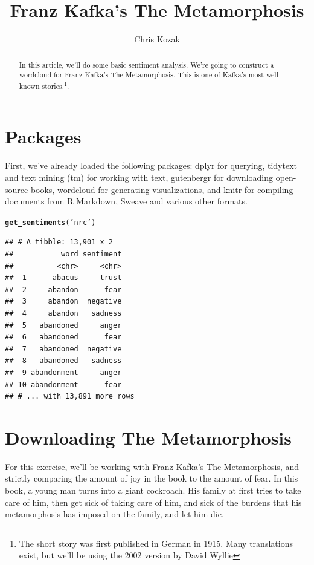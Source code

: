 \documentclass{article}\usepackage[]{graphicx}\usepackage[]{color}
\makeatletter
\newcommand{\hlstr}[1]{\textcolor[rgb]{0.192,0.494,0.8}{#1}}%
\newcommand{\hlstd}[1]{\textcolor[rgb]{0.345,0.345,0.345}{#1}}%
\newcommand{\hlkwd}[1]{\textcolor[rgb]{0.737,0.353,0.396}{\textbf{#1}}}%
\newenvironment{kframe}{%
 \def\at@end@of@kframe{}%
 \ifinner\ifhmode%
  \def\at@end@of@kframe{\end{minipage}}%
  \begin{minipage}{\columnwidth}%
 \fi\fi%
 \def\FrameCommand##1{\hskip\@totalleftmargin \hskip-\fboxsep
 \colorbox{shadecolor}{##1}\hskip-\fboxsep
     \hskip-\linewidth \hskip-\@totalleftmargin \hskip\columnwidth}%
 \MakeFramed {\advance\hsize-\width
   \@totalleftmargin\z@ \linewidth\hsize
   \@setminipage}}%
 {\par\unskip\endMakeFramed%
 \at@end@of@kframe}
\newenvironment{knitrout}{}{} %
\makeatother
\begin{document}
\title{Franz Kafka's The Metamorphosis}
\author{Chris Kozak}
\maketitle

\begin{abstract}
\noindent In this article, we'll do some basic sentiment analysis. We're going to construct a wordcloud for Franz Kafka's The Metamorphosis. This is one of Kafka's most well-known stories.\footnote{The short story was first published in German in 1915. Many translations exist, but we'll be using the 2002 version by David Wyllie}.
\end{abstract}

\section{Packages}
 First, we've already loaded the following packages: dplyr for querying, tidytext and text mining (tm) for working with text, gutenbergr for downloading open-source books, wordcloud for generating visualizations, and knitr for compiling documents from R Markdown, Sweave and various other formats.

\begin{knitrout}
\color{fgcolor}\begin{kframe}
\begin{alltt}
\hlkwd{get_sentiments}\hlstd{(}\hlstr{'nrc'}\hlstd{)}
\end{alltt}
\begin{verbatim}
## # A tibble: 13,901 x 2
##           word sentiment
##          <chr>     <chr>
##  1      abacus     trust
##  2     abandon      fear
##  3     abandon  negative
##  4     abandon   sadness
##  5   abandoned     anger
##  6   abandoned      fear
##  7   abandoned  negative
##  8   abandoned   sadness
##  9 abandonment     anger
## 10 abandonment      fear
## # ... with 13,891 more rows
\end{verbatim}
\end{kframe}
\end{knitrout}


\section{Downloading The Metamorphosis}
For this exercise, we'll be working with Franz Kafka's The Metamorphosis, and strictly comparing the amount of joy in the book to the amount of fear. In this book, a young man turns into a giant cockroach. His family at first tries to take care of him, then get sick of taking care of him, and sick of the burdens that his metamorphosis has imposed on the family, and let him die.
\end{document}
